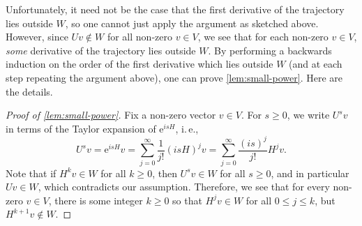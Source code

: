 \documentclass[11pt]{article}
\newcommand{\eee}{\mathrm e}
\newcommand{\ie}{i.\,e.}
\theoremstyle{plain}
\numberwithin{equation}{section}
\theoremstyle{definition}
\begin{document}
Unfortunately, it need not be the case that the first derivative of the trajectory lies outside $W$, so one cannot just apply the argument as sketched above. However, since $Uv \notin W$ for all non-zero $v \in V$, we see that for each non-zero $v \in V$, \emph{some} derivative of the trajectory lies outside $W$. By performing a backwards induction on the order of the first derivative which lies outside $W$ (and at each step repeating the argument above), one can prove \cref{lem:small-power}. Here are the details.
\begin{proof}[Proof of \cref{lem:small-power}]
    Fix a non-zero vector $v \in V$. For $s \geq 0$, we write $U^s v$ in terms of the Taylor expansion of $\eee^{isH}$, \ie,
    \[
        U^s v = \eee^{isH} v = \sum_{j=0}^\infty \frac{1}{j!} (isH)^j v= \sum_{j=0}^\infty \frac{(is)^j}{j!} H^j v.
    \]
    Note that if $H^k v\in W$ for all $k \geq 0$, then $U^s v \in W$ for all $s \geq 0$, and in particular $Uv \in W$, which contradicts our assumption. Therefore, we see that for every non-zero $v \in V$, there is some integer $k \geq 0$ so that $H^j v \in W$ for all $0 \leq j \leq k$, but $H^{k+1}v \notin W$.


\end{proof}
\end{document}
